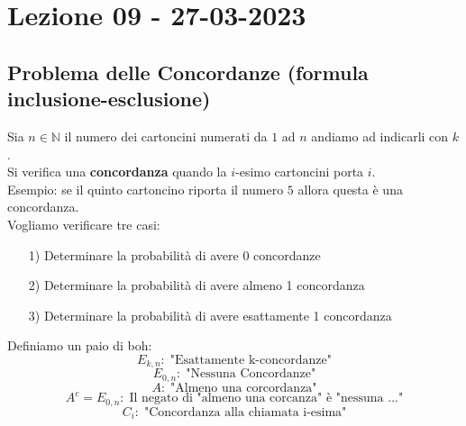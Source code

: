 \section{Lezione 09 - 27-03-2023}

\subsection{Problema delle Concordanze (formula inclusione-esclusione)}
Sia $n \in \mathbb{N}$ il numero dei cartoncini numerati da $1$ ad $n$ andiamo ad indicarli con $k$.\\
Si verifica una \textbf{concordanza} quando la $i$-esimo cartoncini porta $i$.\\
Esempio: se il quinto cartoncino riporta il numero $5$ allora 	questa è una concordanza.\\
Vogliamo verificare tre casi:
\begin{itemize}
\item[1)] Determinare la probabilità di avere 0 concordanze
\item[2)] Determinare la probabilità di avere almeno 1 concordanza
\item[3)] Determinare la probabilità di avere esattamente 1 concordanza
\end{itemize}
Definiamo un paio di boh:
$$ E_{k,n}: \; \text{"Esattamente k-concordanze"} $$
$$ E_{0,n}: \; \text{"Nessuna Concordanze"} $$
$$ A: \; \text{"Almeno una corcordanza"} $$
$$ A^c = E_{0,n}: \; \text{Il negato di "almeno una corcanza" è "nessuna ..."}$$
$$ C_i: \; \text{"Concordanza alla chiamata i-esima"} $$
